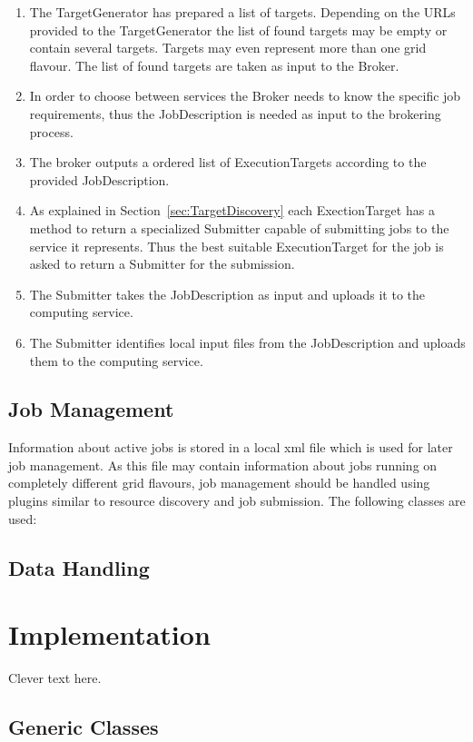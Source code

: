 \documentclass{book}
\begin{document}
\begin{enumerate}
\item{The TargetGenerator has prepared a list of targets. Depending on the URLs provided to the TargetGenerator the list of 
found targets may be empty or contain several targets. Targets may even represent more than one grid flavour. The list of 
found targets are taken as input to the Broker.}
\item{In order to choose between services the Broker needs to know the specific job requirements, thus the JobDescription is 
needed as input to the brokering process.}
\item{The broker outputs a ordered list of ExecutionTargets according to the provided JobDescription.}
\item{As explained in Section~\ref{sec:TargetDiscovery} each ExectionTarget has a method to return a specialized Submitter 
capable of submitting jobs to the service it represents. Thus the best suitable ExecutionTarget for the job is asked to return 
a Submitter for the submission.}
\item{The Submitter takes the JobDescription as input and uploads it to the computing service.}
\item{The Submitter identifies local input files from the JobDescription and uploads them to the computing service.}
\end{enumerate}

\section{Job Management}
Information about active jobs is stored in a local xml file which is used for later job management. As this file may contain 
information about jobs running on completely different grid flavours, job management should be handled using plugins similar to 
resource discovery and job submission. The following classes are used:

\section{Data Handling}
\label{sec:DataHandling}

\chapter{Implementation}
\label{sec:Implementation}
Clever text here.
\section{Generic Classes}
\end{document}
